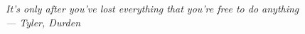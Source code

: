 \thispagestyle{empty}
\mbox{}
\begin{flushright}

{\selectfont
  \vspace{6cm}
  \it{
    It's only after you've lost everything that you're free to do anything
  }
  \\
  --- \textup{Tyler}, \textit{Durden}
}
\end{flushright}